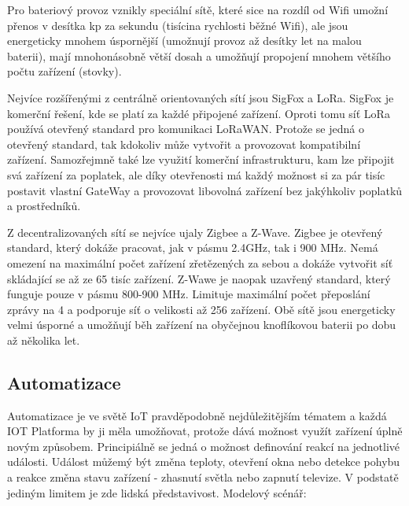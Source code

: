 \documentclass[thesis=B,czech]{FITthesis}[2019/12/23]
\begin{document}
Pro bateriový provoz vznikly speciální sítě, které sice na rozdíl od Wifi umožní přenos v desítka kp za sekundu (tisícina rychlosti běžné Wifi), ale jsou energeticky mnohem úspornější (umožnují provoz až desítky let na malou baterii), mají mnohonásobně větší dosah a umožňují propojení mnohem většího počtu zařízení (stovky).

Nejvíce rozšířenými z centrálně orientovaných sítí jsou SigFox a LoRa. SigFox je komerční řešení, kde se platí za každé připojené zařízení. Oproti tomu síť LoRa používá otevřený standard pro komunikaci LoRaWAN. Protože se jedná o otevřený standard, tak kdokoliv může vytvořit a provozovat kompatibilní zařízení. Samozřejmně také lze využití komerční infrastrukturu, kam lze připojit svá zařízení za poplatek, ale díky otevřenosti má každý možnost si za pár tisíc postavit vlastní GateWay a provozovat libovolná zařízení bez jakýhkoliv poplatků a prostředníků.

Z decentralizovaných sítí se nejvíce ujaly Zigbee a Z-Wave. Zigbee je otevřený standard, který dokáže pracovat, jak v pásmu 2.4GHz, tak i 900 MHz. Nemá omezení na maximální počet zařízení zřetězených za sebou a dokáže vytvořit síť skládající se až ze 65 tisíc zařízení. Z-Wawe je naopak uzavřený standard, který funguje pouze v pásmu 800-900 MHz. Limituje maximální počet přeposlání zprávy na 4 a podporuje síť o velikosti až 256 zařízení. Obě sítě jsou energeticky velmi úsporné a umožňují běh zařízení na obyčejnou knoflíkovou baterii po dobu až několika let.

\subsection{Automatizace}
Automatizace je ve světě IoT pravděpodobně nejdůležitějším tématem a každá IOT Platforma by ji měla umožňovat, protože dává možnost využít zařízení úplně novým způsobem. Principiálně se jedná o možnost definování reakcí na jednotlivé události. Událost můžemý být změna teploty, otevření okna nebo detekce pohybu a reakce změna stavu zařízení - zhasnutí světla nebo zapnutí televize. V podstatě jediným limitem je zde lidská představivost. Modelový scénář:
\end{document}
